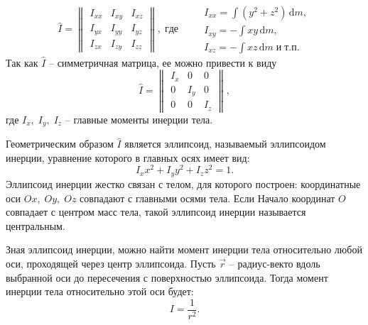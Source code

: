 \documentclass[a4paper, 12pt]{article}
\begin{document}
        \begin{equation*}
            \hat{I} =
            \begin{Vmatrix}
                I_{xx} & I_{xy} & I_{xz}\\
                I_{yx} & I_{yy} & I_{yz}\\
                I_{zx} & I_{zy} & I_{zz}
            \end{Vmatrix},\;где\;\;\;\;\;
            \begin{aligned}
                & I_{xx} = \int (y^2 + z^2)\, \mathrm{d}m,\\ 
                & I_{xy} = -\int xy\, \mathrm{d}m, \\
                & I_{xz} = -\int xz\, \mathrm{d}m\;и\;т.п.
            \end{aligned}
        \end{equation*}
        Так как $\hat{I}$ -- симметричная матрица, ее можно привести к виду
        \begin{equation*}
            \hat{I} =
            \begin{Vmatrix}
                I_{x} & 0 & 0\\
                0 & I_{y} & 0\\
                0 & 0 & I_{z}
            \end{Vmatrix},
        \end{equation*}
        где $I_x,\;I_y,\;I_z$ -- главные моменты инерции тела. 
        
        Геометрическим образом $\hat{I}$ является эллипсоид, называемый эллипсоидом инерции, уравнение которого в главных осях имеет вид:
        \begin{equation}
            I_xx^2 + I_yy^2 + I_zz^2 = 1.
        \end{equation}
        Эллипсоид инерции жестко связан с телом, для которого построен: координатные оси $Ox,\;Oy,\;Oz$ совпадают с главными осями тела. Если Начало координат $O$ совпадает с центром масс тела, такой эллипсоид инерции называется центральным.

        Зная эллипсоид инерции, можно найти момент инерции тела относительно любой оси, проходящей через центр эллипсоида. Пусть $\vec{r}$ -- радиус-векто вдоль выбранной оси до пересечения с поверхностью эллипсоида. Тогда момент инерции тела относительно этой оси будет:
        \begin{equation}
            I = \frac{1}{r^2}.
        \end{equation}
\end{document}
